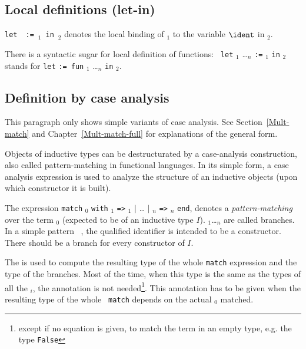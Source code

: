 \subsection{Local definitions (let-in)
\label{let-in}
}


{\tt let}~{\ident}~{\tt :=}~{\term$_1$}~{\tt in}~{\term$_2$} denotes
the local binding of \term$_1$ to the variable $\ident$ in
\term$_2$. 

There is a syntactic sugar for local definition of functions: {\tt
let} {\ident} {\binder$_1$} \ldots {\binder$_n$} {\tt :=} {\term$_1$}
{\tt in} {\term$_2$} stands for {\tt let} {\ident} {\tt := fun}
{\binder$_1$} \ldots {\binder$_n$} {\tt in} {\term$_2$}.


\subsection{Definition by case analysis
\label{caseanalysis}
}


This paragraph only shows simple variants of case analysis. See
Section~\ref{Mult-match} and Chapter~\ref{Mult-match-full} for
explanations of the general form.

Objects of inductive types can be destructurated by a case-analysis
construction, also called pattern-matching in functional languages. In
its simple form, a case analysis expression is used to analyze the
structure of an inductive objects (upon which constructor it is
built).

The expression {\tt match} {\term$_0$} {\returntype} {\tt with}
{\pattern$_1$} {\tt =>} {\term$_1$} {\tt $|$} {\ldots} {\tt $|$}
{\pattern$_n$} {\tt =>} {\term$_n$} {\tt end}, denotes a {\em
pattern-matching} over the term {\term$_0$} (expected to be of an
inductive type $I$). {\term$_1$}\ldots{\term$_n$} are called branches. In
a simple pattern \qualid~\nelist{\ident}{}, the qualified identifier
{\qualid} is intended to
be a constructor. There should be a branch for every constructor of
$I$.

The {\returntype} is used to compute the resulting type of the whole
{\tt match} expression and the type of the branches. Most of the time,
when this type is the same as the types of all the {\term$_i$}, the
annotation is not needed\footnote{except if no equation is given, to
match the term in an empty type, e.g. the type \texttt{False}}. This
annotation has to be given when the resulting type of the whole {\tt
match} depends on the actual {\term$_0$} matched.

